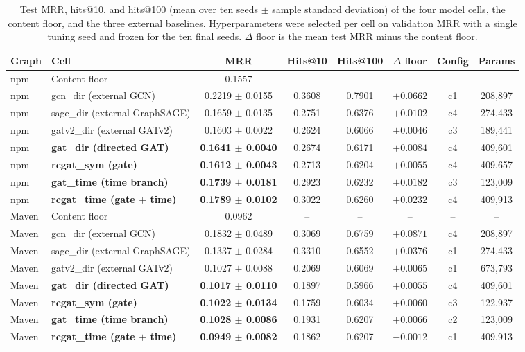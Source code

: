 \begin{table}[t]
\caption{Test MRR, hits@10, and hits@100 (mean over ten seeds $\pm$ sample standard
deviation) of the four model cells, the content floor, and the three external baselines.
Hyperparameters were selected per cell on validation MRR with a single tuning seed and
frozen for the ten final seeds. $\Delta$ floor is the mean test MRR minus the content floor.}
\label{tab:main}
\begin{tabular}{llcccccc}
\toprule
Graph & Cell & MRR & Hits@10 & Hits@100 & $\Delta$ floor & Config & Params \\
\midrule
npm & Content floor & 0.1557 & -- & -- & -- & -- & -- \\
npm & gcn\_dir (external GCN) & 0.2219 $\pm$ 0.0155 & 0.3608 & 0.7901 & $+0.0662$ & c1 & 208{,}897 \\
npm & sage\_dir (external GraphSAGE) & 0.1659 $\pm$ 0.0135 & 0.2751 & 0.6376 & $+0.0102$ & c4 & 274{,}433 \\
npm & gatv2\_dir (external GATv2) & 0.1603 $\pm$ 0.0022 & 0.2624 & 0.6066 & $+0.0046$ & c3 & 189{,}441 \\
npm & \textbf{gat\_dir (directed GAT)} & \textbf{0.1641 $\pm$ 0.0040} & 0.2674 & 0.6171 & $+0.0084$ & c4 & 409{,}601 \\
npm & \textbf{rcgat\_sym (gate)} & \textbf{0.1612 $\pm$ 0.0043} & 0.2713 & 0.6204 & $+0.0055$ & c4 & 409{,}657 \\
npm & \textbf{gat\_time (time branch)} & \textbf{0.1739 $\pm$ 0.0181} & 0.2923 & 0.6232 & $+0.0182$ & c3 & 123{,}009 \\
npm & \textbf{rcgat\_time (gate $+$ time)} & \textbf{0.1789 $\pm$ 0.0102} & 0.3022 & 0.6260 & $+0.0232$ & c4 & 409{,}913 \\
\midrule
Maven & Content floor & 0.0962 & -- & -- & -- & -- & -- \\
Maven & gcn\_dir (external GCN) & 0.1832 $\pm$ 0.0489 & 0.3069 & 0.6759 & $+0.0871$ & c4 & 208{,}897 \\
Maven & sage\_dir (external GraphSAGE) & 0.1337 $\pm$ 0.0284 & 0.3310 & 0.6552 & $+0.0376$ & c1 & 274{,}433 \\
Maven & gatv2\_dir (external GATv2) & 0.1027 $\pm$ 0.0088 & 0.2069 & 0.6069 & $+0.0065$ & c1 & 673{,}793 \\
Maven & \textbf{gat\_dir (directed GAT)} & \textbf{0.1017 $\pm$ 0.0110} & 0.1897 & 0.5966 & $+0.0055$ & c4 & 409{,}601 \\
Maven & \textbf{rcgat\_sym (gate)} & \textbf{0.1022 $\pm$ 0.0134} & 0.1759 & 0.6034 & $+0.0060$ & c3 & 122{,}937 \\
Maven & \textbf{gat\_time (time branch)} & \textbf{0.1028 $\pm$ 0.0086} & 0.1931 & 0.6207 & $+0.0066$ & c2 & 123{,}009 \\
Maven & \textbf{rcgat\_time (gate $+$ time)} & \textbf{0.0949 $\pm$ 0.0082} & 0.1862 & 0.6207 & $-0.0012$ & c1 & 409{,}913 \\
\bottomrule
\end{tabular}
\end{table}
